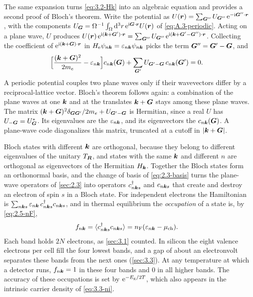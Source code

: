 The same expansion turns \cref{eq:3.2-Hk} into an algebraic equation and provides a second proof of Bloch's theorem. Write the potential as $U(\bm{r}) = \sum_{\bm{G}''}U_{\bm{G}''}\,\mathrm{e}^{-\mathrm{i}\bm{G}''\cdot\bm{r}}$, with the components $U_{\bm{G}} = \Omega^{-1}\int_\Omega\mathrm{d}^3r\,\mathrm{e}^{\mathrm{i}\bm{G}\cdot\bm{r}}U(\bm{r})$ of \cref{eq:A.3-periodic}. Acting on a plane wave, $U$ produces $U(\bm{r})\,\mathrm{e}^{\mathrm{i}(\bm{k}+\bm{G}')\cdot\bm{r}} = \sum_{\bm{G}''}U_{\bm{G}''}\,\mathrm{e}^{\mathrm{i}(\bm{k}+\bm{G}'-\bm{G}'')\cdot\bm{r}}$. Collecting the coefficient of $\mathrm{e}^{\mathrm{i}(\bm{k}+\bm{G})\cdot\bm{r}}$ in $H_{\mathrm{e}}\psi_{n\bm{k}} = \varepsilon_{n\bm{k}}\psi_{n\bm{k}}$ picks the term $\bm{G}'' = \bm{G}' - \bm{G}$, and
\begin{equation}
  \Bigl[\frac{(\bm{k} + \bm{G})^2}{2m_e} - \varepsilon_{n\bm{k}}\Bigr]c_{n\bm{k}}(\bm{G}) + \sum_{\bm{G}'}U_{\bm{G}'-\bm{G}}\,c_{n\bm{k}}(\bm{G}') = 0 .
  \label{eq:3.2-central}
\end{equation}
A periodic potential couples two plane waves only if their wavevectors differ by a reciprocal-lattice vector. Bloch's theorem follows again: a combination of the plane waves at one $\bm{k}$ and at the translates $\bm{k} + \bm{G}$ stays among these plane waves. The matrix $(\bm{k}+\bm{G})^2\delta_{\bm{G}\bm{G}'}/2m_e + U_{\bm{G}'-\bm{G}}$ is Hermitian, since a real $U$ has $U_{-\bm{G}} = U^*_{\bm{G}}$. Its eigenvalues are the $\varepsilon_{n\bm{k}}$, and its eigenvectors the $c_{n\bm{k}}(\bm{G})$. A plane-wave code diagonalizes this matrix, truncated at a cutoff in $|\bm{k}+\bm{G}|$.

Bloch states with different $\bm{k}$ are orthogonal, because they belong to different eigenvalues of the unitary $T_{\bm{R}}$, and states with the same $\bm{k}$ and different $n$ are orthogonal as eigenvectors of the Hermitian $H_{\bm{k}}$. Together the Bloch states form an orthonormal basis, and the change of basis of \cref{eq:2.3-basis} turns the plane-wave operators of \cref{sec:2.3} into operators $c^\dagger_{n\bm{k}s}$ and $c_{n\bm{k}s}$ that create and destroy an electron of spin $s$ in a Bloch state. For independent electrons the Hamiltonian is $\sum_{n\bm{k}s}\varepsilon_{n\bm{k}}\,c^\dagger_{n\bm{k}s}c_{n\bm{k}s}$, and in thermal equilibrium the \emph{occupation} of a state is, by \cref{eq:2.5-nF},
\begin{equation}
  f_{n\bm{k}} = \langle c^\dagger_{n\bm{k}s}c_{n\bm{k}s}\rangle = n_{\mathrm{F}}(\varepsilon_{n\bm{k}} - \mu_{\mathrm{ch}}) .
  \label{eq:3.2-fnk}
\end{equation}
Each band holds $2N$ electrons, as \cref{sec:3.1} counted. In silicon the eight valence electrons per cell fill the four lowest bands, and a gap of about an electronvolt separates these bands from the next ones (\cref{sec:3.3}). At any temperature at which a detector runs, $f_{n\bm{k}} = 1$ in these four bands and $0$ in all higher bands. The accuracy of these occupations is set by $\mathrm{e}^{-E_{\mathrm{g}}/2T}$, which also appears in the intrinsic carrier density of \cref{eq:3.3-ni}.

